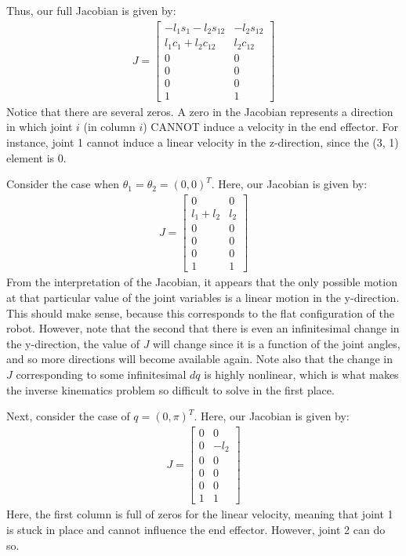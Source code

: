 \documentclass[../../master-handout.tex]{subfiles}
\begin{document}
Thus, our full Jacobian is given by:
\begin{align*}
    J = \begin{bmatrix}
         -l_1s_1 - l_2s_{12} &  - l_2s_{12}\\ l_1c_1 + l_2c_{12} & l_2c_{12} \\ 0 & 0 \\ 0 & 0\\ 0 & 0 \\ 1 & 1
    \end{bmatrix}
\end{align*}
Notice that there are several zeros. A zero in the Jacobian represents a direction in which joint $i$ (in column $i$) CANNOT induce a velocity in the end effector. For instance, joint 1 cannot induce a linear velocity in the z-direction, since the (3, 1) element is 0.

Consider the case when $\theta_1 = \theta_2 = (0, 0)^T$. Here, our Jacobian is given by:
\begin{align*}
    J = \begin{bmatrix}
         0 &  0\\ l_1 + l_2 & l_2 \\ 0 & 0 \\ 0 & 0\\ 0 & 0 \\ 1 & 1
    \end{bmatrix}
\end{align*}
From the interpretation of the Jacobian, it appears that the only possible motion at that particular value of the joint variables is a linear motion in the y-direction. This should make sense, because this corresponds to the flat configuration of the robot. However, note that the second that there is even an infinitesimal change in the y-direction, the value of $J$ will change since it is a function of the joint angles, and so more directions will become available again. Note also that the change in $J$ corresponding to some infinitesimal $dq$ is highly nonlinear, which is what makes the inverse kinematics problem so difficult to solve in the first place.

Next, consider the case of $q = (0, \pi)^T$. Here, our Jacobian is given by:
\begin{align*}
    J = \begin{bmatrix}
         0 &  0\\ 0 & -l_2 \\ 0 & 0 \\ 0 & 0\\ 0 & 0 \\ 1 & 1
    \end{bmatrix}
\end{align*}
Here, the first column is full of zeros for the linear velocity, meaning that joint 1 is stuck in place and cannot influence the end effector. However, joint 2 can do so.
\end{document}
